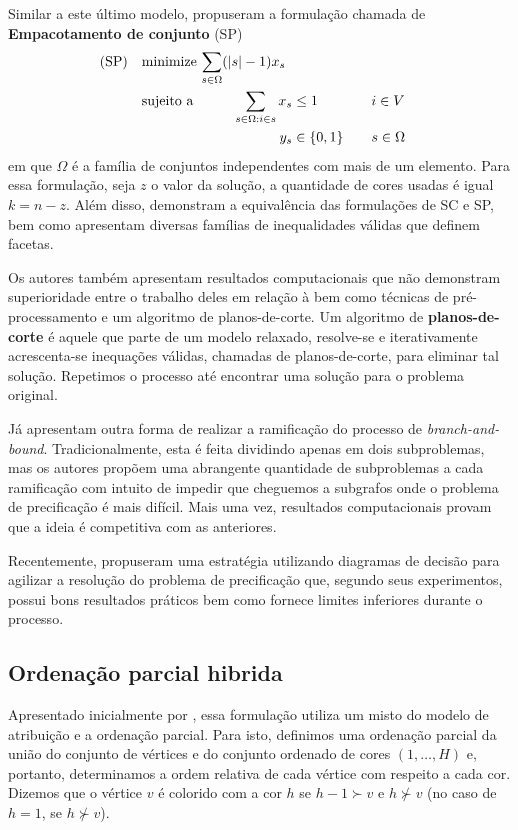 \documentclass[11pt]{article}
\begin{document}
Similar a este último modelo, \textcite{Hansen2009Setcoveringpacking} propuseram a formulação chamada de \textbf{Empacotamento de conjunto} (SP)
\begin{alignat*}{4}
\mathrm{(SP)} \quad & \omit\rlap{minimize  $\displaystyle \sum_{s \in \Omega} (|s| - 1)x_s$} \\
& \mbox{sujeito a}&& \quad & \sum_{s \in \Omega: i \in s} x_{s}&\leq 1 & \quad & i \in V \\
&                 &&   & y_s       & \in \{0,1\} &    & s \in \Omega
\end{alignat*}
em que \(\Omega\) é a família de conjuntos independentes com mais de um elemento.
Para essa formulação, seja \(z\) o valor da solução, a quantidade de cores usadas é igual \(k = n - z\).
Além disso, \textcite{Hansen2009Setcoveringpacking} demonstram a equivalência das formulações de SC e SP, bem como apresentam diversas famílias de inequalidades válidas que definem facetas.

Os autores também apresentam resultados computacionais que não demonstram superioridade entre o trabalho deles em relação à \textcite{Mehrotra1996ColumnGenerationApproach} bem como técnicas de pré-processamento e um algoritmo de planos-de-corte.
Um algoritmo de \textbf{planos-de-corte} é aquele que parte de um modelo relaxado, resolve-se e iterativamente acrescenta-se inequações válidas, chamadas de planos-de-corte, para eliminar tal solução.
Repetimos o processo até encontrar uma solução para o problema original.

Já \textcite{Morrison2014WideBranchingStrategy} apresentam outra forma de realizar a ramificação do processo de \emph{branch-and-bound}.
Tradicionalmente, esta é feita dividindo apenas em dois subproblemas, mas os autores propõem uma abrangente quantidade de subproblemas a cada ramificação com intuito de impedir que cheguemos a subgrafos onde o problema de precificação é mais difícil.
Mais uma vez, resultados computacionais provam que a ideia é competitiva com as anteriores.

Recentemente, \textcite{Morrison2016SolvingPricingProblem} propuseram uma estratégia utilizando diagramas de decisão para agilizar a resolução do problema de precificação que, segundo seus experimentos, possui bons resultados práticos bem como fornece limites inferiores durante o processo.

\subsection{Ordenação parcial hibrida}
\label{sec:org7825c75}
Apresentado inicialmente por \textcite{Jabrayilov2018NewIntegerLinear}, essa formulação utiliza um misto do modelo de atribuição e a ordenação parcial.
Para isto, definimos uma ordenação parcial da união do conjunto de vértices e do conjunto ordenado de cores \((1, \dots, H)\) e, portanto, determinamos a ordem relativa de cada vértice com respeito a cada cor.
Dizemos que o vértice \(v\) é colorido com a cor \(h\) se \(h-1 \succ v\) e \(h \nsucc v\) (no caso de \(h=1\), se \(h \nsucc v\)).
\end{document}
